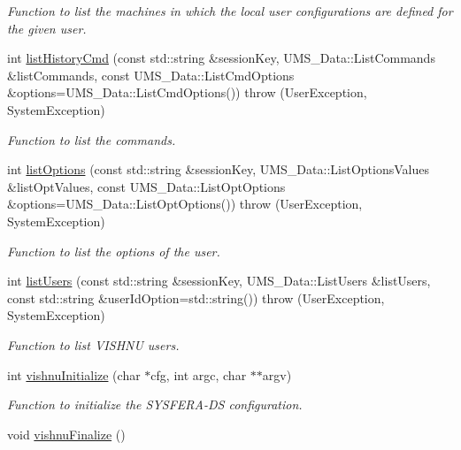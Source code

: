 \begin{DoxyCompactItemize}
\begin{DoxyCompactList}\small\item\em Function to list the machines in which the local user configurations are defined for the given user. \item\end{DoxyCompactList}\item 
int \hyperlink{namespacevishnu_a8576a50af31abe3869a61bec780aa5ef}{listHistoryCmd} (const std::string \&sessionKey, UMS\_\-Data::ListCommands \&listCommands, const UMS\_\-Data::ListCmdOptions \&options=UMS\_\-Data::ListCmdOptions())  throw (UserException, SystemException)
\begin{DoxyCompactList}\small\item\em Function to list the commands. \item\end{DoxyCompactList}\item 
int \hyperlink{namespacevishnu_a53106e021a6e98049b41106c12356e28}{listOptions} (const std::string \&sessionKey, UMS\_\-Data::ListOptionsValues \&listOptValues, const UMS\_\-Data::ListOptOptions \&options=UMS\_\-Data::ListOptOptions())  throw (UserException, SystemException)
\begin{DoxyCompactList}\small\item\em Function to list the options of the user. \item\end{DoxyCompactList}\item 
int \hyperlink{namespacevishnu_a6a0175686b0d2aff434015fc61c62ce6}{listUsers} (const std::string \&sessionKey, UMS\_\-Data::ListUsers \&listUsers, const std::string \&userIdOption=std::string())  throw (UserException, SystemException)
\begin{DoxyCompactList}\small\item\em Function to list VISHNU users. \item\end{DoxyCompactList}\item 
int \hyperlink{namespacevishnu_adc7892040980c12dd70ed3228f350313}{vishnuInitialize} (char $\ast$cfg, int argc, char $\ast$$\ast$argv)
\begin{DoxyCompactList}\small\item\em Function to initialize the SYSFERA-\/DS configuration. \item\end{DoxyCompactList}\item 
\hypertarget{namespacevishnu_a5ef439295f52f8055a0771ae9f257b68}{
void \hyperlink{namespacevishnu_a5ef439295f52f8055a0771ae9f257b68}{vishnuFinalize} ()}
\label{namespacevishnu_a5ef439295f52f8055a0771ae9f257b68}


\end{DoxyCompactItemize}
